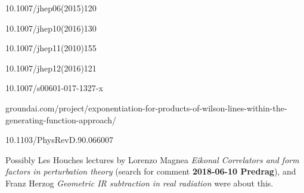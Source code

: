 { {10.1007/jhep06(2015)120}

 {10.1007/jhep10(2016)130}

 {10.1007/jhep11(2010)155}

 {10.1007/jhep12(2016)121}

 {10.1007/s00601-017-1327-x}

 {groundai.com/project/exponentiation-for-products-of-wilson-lines-within-the-generating-function-approach/}

 {10.1103/PhysRevD.90.066007}

Possibly Les Houches lectures by
 {Lorenzo Magnea}
{\em Eikonal Correlators and form factors in perturbation
theory}
(search for comment {\bf 2018-06-10 Predrag}),
and
 {Franz Herzog}
{\em Geometric IR subtraction in real radiation}
were about this.


    } %

\RemarksEnd
